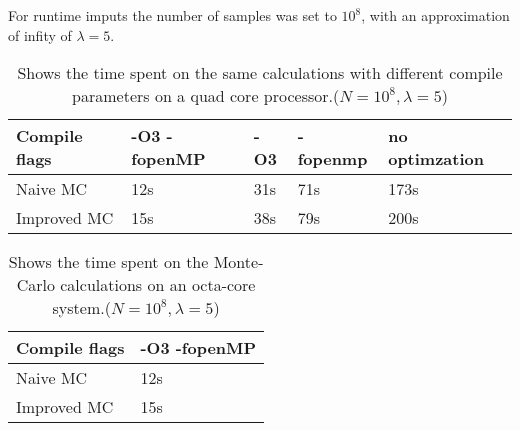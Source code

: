 \documentclass[../main.tex]{subfiles}
\begin{document}
For runtime imputs the number of samples was set to $10^8$, with an approximation of infity of $\lambda = 5$.
\begin{table}[!h]
\begin{center}
    \begin{tabular}{ l | l l l l }

        Compile flags & -O3 -fopenMP \hspace{5mm} & -O3 \hspace{1cm} & -fopenmp\hspace{5mm} & no optimzation \\
        \hline
        Naive MC      & 12s          & 31s &    71s      & 173s           \\
        Improved MC   & 15s          & 38s &     79s     & 200s
    \end{tabular}
    \caption{Shows the time spent on the same calculations with different compile parameters on a quad core processor.($N = 10^8, \lambda = 5$)} \label{tab:res-paralell}
    \end{center}
\end{table}

\begin{table}[!h]
\begin{center}
    \begin{tabular}{ l | l }

        Compile flags & -O3 -fopenMP \\
        \hline
        Naive MC      & 12s      \\
        Improved MC   & 15s
    \end{tabular}
    \caption{Shows the time spent on the Monte-Carlo calculations on an octa-core system.($N = 10^8, \lambda = 5$)} \label{tab:res-paralell-octacore}
    \end{center}
\end{table}
\end{document}
